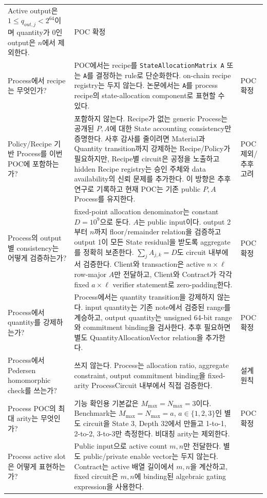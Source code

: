 \documentclass[11pt]{extarticle}
\begin{document}
{\begin{longtable}[]{@{}L{0.24\textwidth}L{0.56\textwidth}L{0.12\textwidth}@{}}
Active output은 $1\leq q_{out,j}<2^{64}$이며 quantity가 0인 output은 $n$에서 제외한다. &
POC 확정 \\
Process에서 recipe는 무엇인가? & POC에서는 recipe를
\texttt{StateAllocationMatrix\ A} 또는 \texttt{A}를 결정하는 rule로
단순화한다. on-chain recipe registry는 두지 않는다. 논문에서는 \texttt{A}를
process recipe의 state-allocation component로 표현할 수 있다. & POC 확정 \\
Policy/Recipe 기반 Process를 이번 POC에 포함하는가? & 포함하지 않는다.
Recipe가 없는 generic Process는 공개된 $P,A$에 대한 State accounting consistency만
증명한다. 사후 감사를 줄이려면 Material과 Quantity transition까지 강제하는
Recipe/Policy가 필요하지만, Recipe별 circuit은 공정을 노출하고 hidden Recipe
registry는 승인 주체와 data availability의 신뢰 문제를 추가한다. 이 방향은 추후
연구로 기록하고 현재 POC는 기존 public $P,A$ Process를 유지한다. & POC 제외/추후 고려 \\
Process의 output별 consistency는 어떻게 검증하는가? & fixed-point
allocation denominator는 constant $D=10^9$으로 둔다. $A$는 public input이다.
output 2부터 $n$까지 floor/remainder relation을
검증하고 output 1이 모든 State residual을 받도록 aggregate를 정확히 보존한다.
$\sum_j A_{j,k}=D$도 circuit 내부에서 검증한다. Client와 transaction은 active
$n\times\ell$ row-major $A$만 전달하고, Client와 Contract가 각각 fixed
$a\times\ell$ verifier statement로 zero-padding한다. & POC 확정 \\
Process에서 quantity를 강제하는가? & Process에서는 quantity
transition을 강제하지 않는다. input quantity는 기존 note에서 검증된 range를 계승하고,
output quantity는 unsigned 64-bit range와 commitment binding을 검사한다.
추후 필요하면 별도 QuantityAllocationVector
relation을 추가한다. & POC 확정 \\
Process에서 Pedersen homomorphic check를 쓰는가? & 쓰지 않는다.
Process는 allocation ratio, aggregate constraint, output commitment
binding을 fixed-arity ProcessCircuit 내부에서 직접 검증한다. & 설계
원칙 \\
Process POC의 최대 arity는 무엇인가? & 기능 확인용 기본값은
$M_{\max}=N_{\max}=3$이다. Benchmark는 $M_{\max}=N_{\max}=a$,
$a\in\{1,2,3\}$인 별도 circuit을 State 3, Depth 32에서 만들고
1-to-1, 2-to-2, 3-to-3만 측정한다.
비대칭 arity는 제외한다. & POC 확정 \\
Process active slot은 어떻게 표현하는가? & Public input으로 active count $m,n$만
전달한다. 별도 public/private enable vector는 두지 않는다. Contract는 active 배열 길이에서
$m,n$을 계산하고, fixed circuit은 $m,n$에 binding된 algebraic gating expression을 사용한다.

\end{longtable}}
\end{document}
